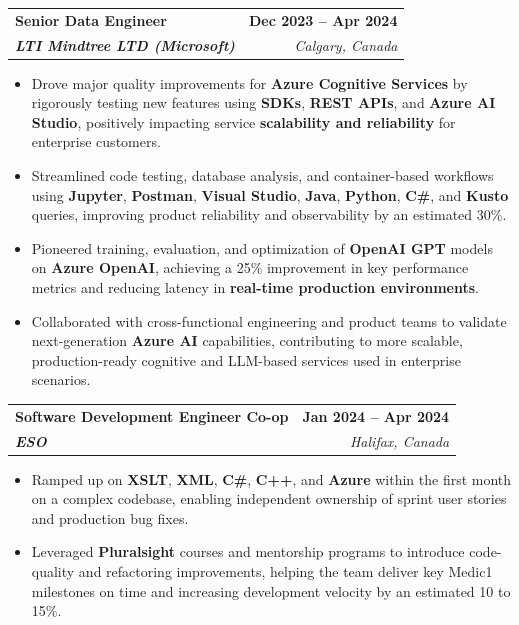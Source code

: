\documentclass[letterpaper,11pt]{article}
\makeatletter
\newcommand{\resumeItem}[1]{
  \item\small{
    {#1 \vspace{-2pt}}
  }
}
\newcommand{\resumeSubheading}[4]{
  \vspace{-2pt}\item
    \begin{tabular*}{1.0\textwidth}[t]{l@{\extracolsep{\fill}}r}
      \textbf{#1} & \textbf{\small #2} \\
      \textit{\small#3} & \textit{\small #4} \\
    \end{tabular*}\vspace{-7pt}
}
\newcommand{\resumeItemListStart}{\begin{itemize}}
\newcommand{\resumeItemListEnd}{\end{itemize}\vspace{-5pt}}
\makeatother
\begin{document}
    \resumeSubheading
      {\textbf{Senior Data Engineer}}{\textbf{Dec 2023 -- Apr 2024}}
      {\textbf{LTI Mindtree LTD (Microsoft)}}{Calgary, Canada}
      \resumeItemListStart
        \resumeItem{Drove major quality improvements for \textbf{Azure Cognitive Services} by rigorously testing new features using \textbf{SDKs}, \textbf{REST APIs}, and \textbf{Azure AI Studio}, positively impacting service \textbf{scalability and reliability} for enterprise customers.}
        \resumeItem{Streamlined code testing, database analysis, and container-based workflows using \textbf{Jupyter}, \textbf{Postman}, \textbf{Visual Studio}, \textbf{Java}, \textbf{Python}, \textbf{C\#}, and \textbf{Kusto} queries, improving product reliability and observability by an estimated 30\%.}
        \resumeItem{Pioneered training, evaluation, and optimization of \textbf{OpenAI GPT} models on \textbf{Azure OpenAI}, achieving a 25\% improvement in key performance metrics and reducing latency in \textbf{real-time production environments}.}
        \resumeItem{Collaborated with cross-functional engineering and product teams to validate next-generation \textbf{Azure AI} capabilities, contributing to more scalable, production-ready cognitive and LLM-based services used in enterprise scenarios.}
      \resumeItemListEnd
    
    \resumeSubheading
      {\textbf{Software Development Engineer Co-op}}{\textbf{Jan 2024 -- Apr 2024}}
      {\textbf{ESO}}{Halifax, Canada}
      \resumeItemListStart
        \resumeItem{Ramped up on \textbf{XSLT}, \textbf{XML}, \textbf{C\#}, \textbf{C++}, and \textbf{Azure} within the first month on a complex codebase, enabling independent ownership of sprint user stories and production bug fixes.}
        \resumeItem{Leveraged \textbf{Pluralsight} courses and mentorship programs to introduce code-quality and refactoring improvements, helping the team deliver key Medic1 milestones on time and increasing development velocity by an estimated 10 to 15\%.}
      \resumeItemListEnd
\end{document}
